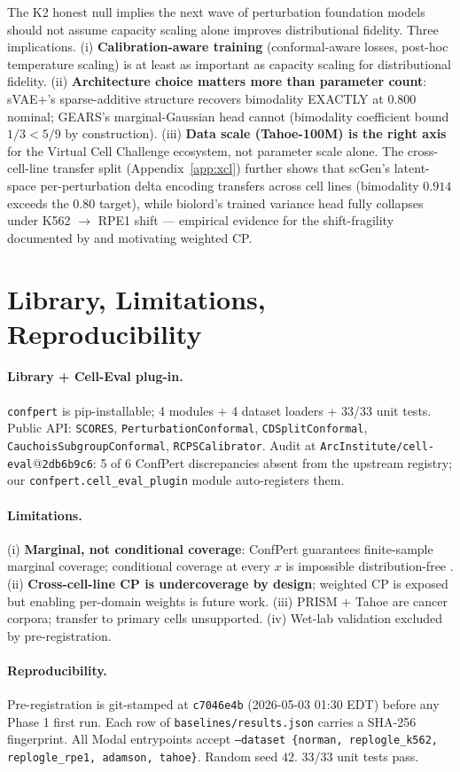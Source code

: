 \documentclass{article}
\begin{document}
The K2 honest null implies the next wave of perturbation foundation models should not assume capacity scaling alone improves distributional fidelity. Three implications. (i) \textbf{Calibration-aware training} (conformal-aware losses, post-hoc temperature scaling) is at least as important as capacity scaling for distributional fidelity. (ii) \textbf{Architecture choice matters more than parameter count}: sVAE+'s sparse-additive structure recovers bimodality EXACTLY at $0.800$ nominal; GEARS's marginal-Gaussian head cannot (bimodality coefficient bound $1/3 < 5/9$ by construction). (iii) \textbf{Data scale (Tahoe-100M) is the right axis} for the Virtual Cell Challenge ecosystem, not parameter scale alone. The cross-cell-line transfer split (Appendix~\ref{app:xcl}) further shows that scGen's latent-space per-perturbation delta encoding transfers across cell lines (bimodality $0.914$ exceeds the $0.80$ target), while biolord's trained variance head fully collapses under K562 $\rightarrow$ RPE1 shift --- empirical evidence for the shift-fragility documented by \citet{tibshirani2019} and motivating weighted CP.

\section{Library, Limitations, Reproducibility}

\paragraph{Library + Cell-Eval plug-in.} \texttt{confpert} is pip-installable; 4 modules + 4 dataset loaders + 33/33 unit tests. Public API: \texttt{SCORES}, \texttt{PerturbationConformal}, \texttt{CDSplitConformal}, \texttt{CauchoisSubgroupConformal}, \texttt{RCPSCalibrator}. Audit at \texttt{ArcInstitute/cell-eval}@\texttt{2db6b9c6}: 5 of 6 ConfPert discrepancies absent from the upstream registry; our \texttt{confpert.cell\_eval\_plugin} module auto-registers them.

\paragraph{Limitations.} (i) \textbf{Marginal, not conditional coverage}: ConfPert guarantees finite-sample marginal coverage; conditional coverage at every $x$ is impossible distribution-free \citep{vovk2012}. (ii) \textbf{Cross-cell-line CP is undercoverage by design}; \citet{tibshirani2019} weighted CP is exposed but enabling per-domain weights is future work. (iii) PRISM + Tahoe are cancer corpora; transfer to primary cells unsupported. (iv) Wet-lab validation excluded by pre-registration.

\paragraph{Reproducibility.} Pre-registration is git-stamped at \texttt{c7046e4b} (2026-05-03 01:30 EDT) before any Phase 1 first run. Each row of \texttt{baselines/results.json} carries a SHA-256 fingerprint. All Modal entrypoints accept \texttt{--dataset \{norman, replogle\_k562, replogle\_rpe1, adamson, tahoe\}}. Random seed $42$. 33/33 unit tests pass.



\end{document}
